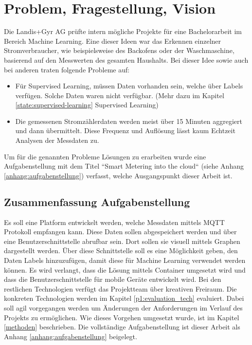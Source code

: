 \chapter{Problem, Fragestellung, Vision}

Die Landis+Gyr AG prüfte intern mögliche Projekte für eine Bachelorarbeit im Bereich Machine Learning.
Eine dieser Ideen war das Erkennen einzelner Stromverbraucher, wie beispielsweise des Backofens oder der Waschmaschine,
basierend auf den Messwerten des gesamten Haushalts.
Bei dieser Idee sowie auch bei anderen traten folgende Probleme auf:
\begin{itemize}
      \item Für Supervised Learning, müssen Daten vorhanden sein,
            welche über Labels verfügen. 
            Solche Daten waren nicht verfügbar. (Mehr dazu im Kapitel \ref{state:supervised-learning} Supervised Learning)
      \item Die gemessenen Stromzählerdaten werden meist über 15 Minuten aggregiert und dann übermittelt.
            Diese Frequenz und Auflösung lässt kaum Echtzeit Analysen der Messdaten zu.

\end{itemize}

Um für die genannten Probleme Lösungen zu erarbeiten wurde eine Aufgabenstellung mit dem Titel ``Smart Metering into the cloud`` (siehe Anhang \ref{anhang:aufgabenstellung}) verfasst,
welche Ausgangspunkt dieser Arbeit ist.

\section{Zusammenfassung Aufgabenstellung}
\label{aufgabenstellung}

Es soll eine Platform entwickelt werden, welche Messdaten mittels \ac{MQTT} Protokoll  empfangen kann.
Diese Daten sollen abgespeichert werden und über eine Benutzerschnittstelle abrufbar sein.
Dort sollen sie visuell mittels Graphen dargestellt werden.
Über diese Schnittstelle soll es eine Möglichkeit geben, den Daten Labels hinzuzufügen,
damit diese für Machine Learning verwendet werden können.
Es wird verlangt, dass die Lösung mittels Container umgesetzt wird und dass die Benutzerschnittstelle für mobile Geräte entwickelt wird.
Bei den restlichen Technologien verfügt das Projektteam über kreativen Freiraum.
Die konkreten Technologien werden im Kapitel \ref{p1:evaluation_tech} evaluiert.
Dabei soll agil vorgegangen werden um Änderungen der Anforderungen im Verlauf des Projekts zu ermöglichen.
Wie dieses Vorgehen umgesetzt wurde, ist im Kapitel \ref{methoden} beschrieben.
Die vollständige Aufgabenstellung ist dieser Arbeit als Anhang \ref{anhang:aufgabenstellung} beigelegt.

